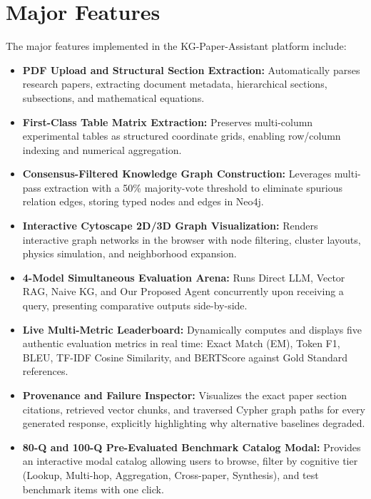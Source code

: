 \section{Major Features}
The major features implemented in the KG-Paper-Assistant platform include:
\begin{itemize}
    \item \textbf{PDF Upload and Structural Section Extraction:} Automatically parses research papers, extracting document metadata, hierarchical sections, subsections, and mathematical equations.
    \item \textbf{First-Class Table Matrix Extraction:} Preserves multi-column experimental tables as structured coordinate grids, enabling row/column indexing and numerical aggregation.
    \item \textbf{Consensus-Filtered Knowledge Graph Construction:} Leverages multi-pass extraction with a 50\% majority-vote threshold to eliminate spurious relation edges, storing typed nodes and edges in Neo4j.
    \item \textbf{Interactive Cytoscape 2D/3D Graph Visualization:} Renders interactive graph networks in the browser with node filtering, cluster layouts, physics simulation, and neighborhood expansion.
    \item \textbf{4-Model Simultaneous Evaluation Arena:} Runs Direct LLM, Vector RAG, Naive KG, and Our Proposed Agent concurrently upon receiving a query, presenting comparative outputs side-by-side.
    \item \textbf{Live Multi-Metric Leaderboard:} Dynamically computes and displays five authentic evaluation metrics in real time: Exact Match (EM), Token F1, BLEU, TF-IDF Cosine Similarity, and BERTScore against Gold Standard references.
    \item \textbf{Provenance and Failure Inspector:} Visualizes the exact paper section citations, retrieved vector chunks, and traversed Cypher graph paths for every generated response, explicitly highlighting why alternative baselines degraded.
    \item \textbf{80-Q and 100-Q Pre-Evaluated Benchmark Catalog Modal:} Provides an interactive modal catalog allowing users to browse, filter by cognitive tier (Lookup, Multi-hop, Aggregation, Cross-paper, Synthesis), and test benchmark items with one click.
\end{itemize}

